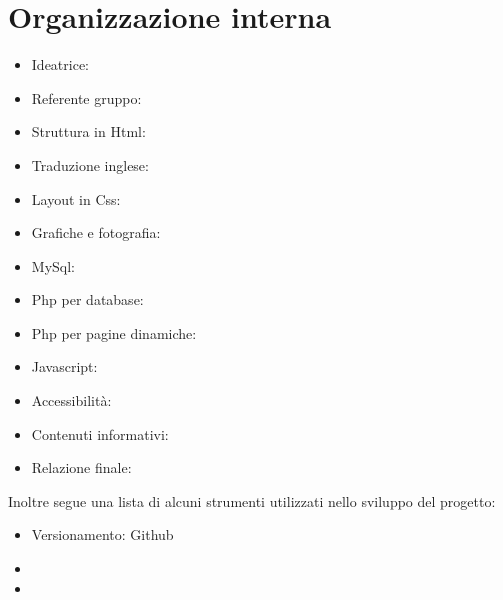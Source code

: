 \section{Organizzazione interna}
\begin{itemize}
\item Ideatrice: 
\item Referente gruppo: 
\item Struttura in Html:
\item Traduzione inglese:  
\item Layout in Css:
\item Grafiche e fotografia:
\item MySql:
\item Php per database:
\item Php per pagine dinamiche:
\item Javascript: 
\item Accessibilità:
\item Contenuti informativi:
\item Relazione finale: 
\end{itemize}

Inoltre segue una lista di alcuni strumenti utilizzati nello sviluppo del progetto:
\begin{itemize}
\item Versionamento: Github
\item 
\item
\end{itemize}